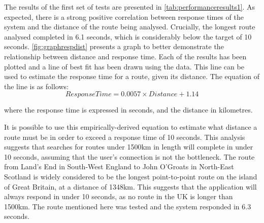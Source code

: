 \documentclass[authoryearcitations]{UoYCSproject}
\begin{document}
The results of the first set of tests are presented in \autoref{tab:performanceresults1}. As expected, there is a strong positive correlation between response times of the system and the distance of the route being analysed. Crucially, the longest route analysed completed in 6.1 seconds, which is considerably below the target of 10 seconds. \autoref{fig:graphrespdist} presents a graph to better demonstrate the relationship between distance and response time. Each of the results has been plotted and a line of best fit has been drawn using the data. This line can be used to estimate the response time for a route, given its distance. The equation of the line is as follows:
$$ Response Time = 0.0057\times Distance + 1.14$$

where the response time is expressed in seconds, and the distance in kilometres.

It is possible to use this empirically-derived equation to estimate what distance a route must be in order to exceed a response time of 10 seconds. This analysis suggests that searches for routes under 1500km in length will complete in under 10 seconds, assuming that the user's connection is not the bottleneck. The route from Land's End in South-West England to John O'Groats in North-East Scotland is widely considered to be the longest point-to-point route on the island of Great Britain, at a distance of 1348km. This suggests that the application will always respond in under 10 seconds, as no route in the UK is longer than 1500km. The route mentioned here was tested and the system responded in 6.3 seconds. 
\end{document}
